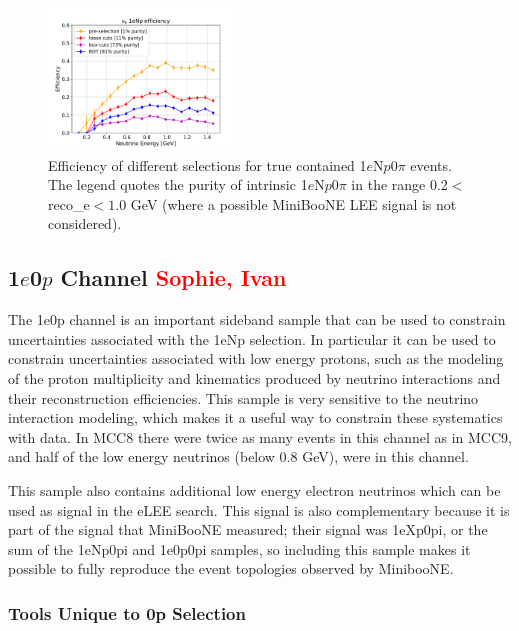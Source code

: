 \documentclass[a4paper]{article}
\newcommand{\npsel}{1$e$N$p$0$\pi$ }
\begin{document}
\begin{figure}[H]
\begin{center}
\includegraphics[width=0.45\textwidth]{1eNp/effpur_1eNp_cut_bdt.pdf}
\caption{\label{fig:1eNp:effpur:RUN1} Efficiency of different selections for true contained \npsel events. The legend quotes the purity of intrinsic \npsel in the range 0.2$<$reco\_e$<1.0$ GeV (where a possible MiniBooNE LEE signal is not considered).}
\end{center}
\end{figure}

\subsection{1$e$0$p$ Channel \textcolor{red}{Sophie, Ivan}}
\label{sec:nueselection:1e0p}
The 1e0p channel is an important sideband sample that can be used to constrain uncertainties associated with the 1eNp selection.  In particular it can be used to constrain uncertainties associated with low energy protons, such as the modeling of the proton multiplicity and kinematics produced by neutrino interactions and their reconstruction efficiencies.  This sample is very sensitive to the neutrino interaction modeling, which makes it a useful way to constrain these systematics with data.  In MCC8 there were twice as many events in this channel as in MCC9, and half of the low energy neutrinos (below 0.8 GeV), were in this channel.

This sample also contains additional low energy electron neutrinos which can be used as signal in the eLEE search.  This signal is also complementary because it is part of the signal that MiniBooNE measured; their signal was 1eXp0pi, or the sum of the 1eNp0pi and 1e0p0pi samples, so including this sample makes it possible to fully reproduce the event topologies observed by MinibooNE.    

\subsubsection{Tools Unique to 0p Selection}
\end{document}
